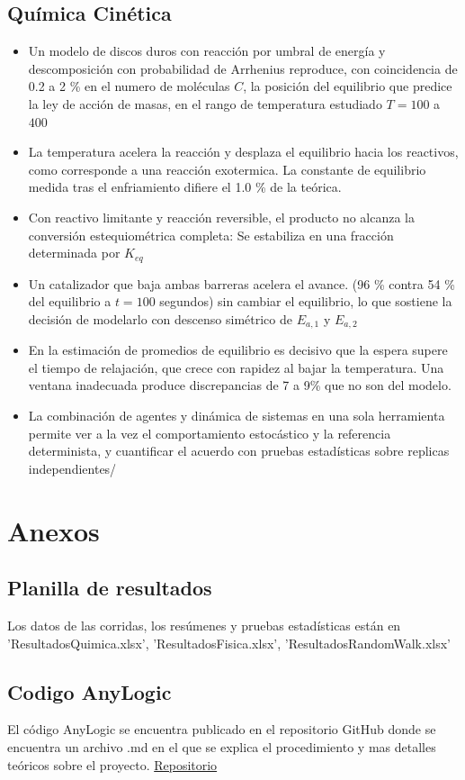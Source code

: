 \documentclass{article}
\begin{document}
\subsection{Química Cinética}
\begin{itemize}
    \item Un modelo de discos duros con reacción por umbral de energía y descomposición con probabilidad de Arrhenius reproduce, con coincidencia de 0.2 a 2 \% en el numero de moléculas $C$, la posición del equilibrio que predice la ley de acción de masas, en el rango de temperatura estudiado $T=100$ a $400$
    \item La temperatura acelera la reacción y desplaza el equilibrio hacia los reactivos, como corresponde a una reacción exotermica. La constante de equilibrio medida tras el enfriamiento difiere el 1.0 \% de la teórica.
    \item Con reactivo limitante y reacción reversible, el producto no alcanza la conversión estequiométrica completa: Se estabiliza en una fracción determinada por $K_{eq}$
    \item Un catalizador que baja ambas barreras acelera el avance. (96 \% contra 54 \% del equilibrio a $t=100$ segundos) sin cambiar el equilibrio, lo que sostiene la decisión de modelarlo con descenso simétrico de $E_{a,1}$ y $E_{a,2}$
    \item En la estimación de promedios de equilibrio es decisivo que la espera supere el tiempo de relajación, que crece con rapidez al bajar la temperatura. Una ventana inadecuada produce discrepancias de 7 a 9\% que no son del modelo.
    \item La combinación de agentes y dinámica de sistemas en una sola herramienta permite ver a la vez el comportamiento estocástico y la referencia determinista, y cuantificar el acuerdo con pruebas estadísticas sobre replicas independientes/
\end{itemize}

\section{Anexos}
\subsection{Planilla de resultados}
Los datos de las corridas, los resúmenes y pruebas estadísticas están en 'Resultados\textunderscore Quimica.xlsx', 'Resultados\textunderscore Fisica.xlsx', 'Resultados\textunderscore RandomWalk.xlsx'
\subsection{Codigo AnyLogic}
El código AnyLogic se encuentra publicado en el repositorio GitHub donde se encuentra un archivo .md en el que se explica el procedimiento y mas detalles teóricos sobre el proyecto. \href{https://github.com/Salograma/Simulaci-nUTN/tree/main/Simulacion%20TPI}{Repositorio}
\end{document}
